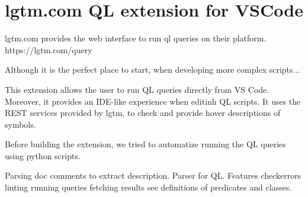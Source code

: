 

\section{lgtm.com QL extension for VSCode}

lgtm.com provides the web interface to run ql queries on their platform.
https://lgtm.com/query

Although it is the perfect place to start, when developing more complex scripts...

This extension allows the user to run QL queries directly from VS Code.
Moreover, it provides an IDE-like experience when editinh QL scripts.
It uses the REST services provided by lgtm, to check and provide hover descriptions of symbols.

Before building the extension, we tried to automatize running the QL queries using python
scripts.

Parsing doc comments to extract description.
Parser for QL.
Features
checkerrors linting
running queries
fetching results
see definitions of predicates and classes.
